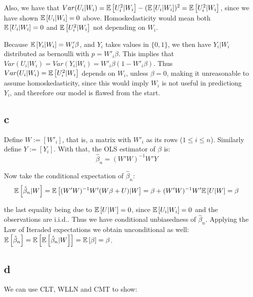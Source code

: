 \documentclass[12pt]{paper}
\begin{document}
Also, we have that $Var(U_i|W_i)=\mathbb{E} \left [ U_i^2|W_i \right ]-(\mathbb{E} \left [ U_i|W_i \right ])^2=\mathbb{E} \left [ U_i^2|W_i \right ]$, since we have shown $\mathbb{E} \left [ U_i|W_i \right ]=0$ above. Homoskedasticity would mean both $\mathbb{E} \left [ U_i|W_i \right ]=0$ and $\mathbb{E} \left [ U_i^2|W_i \right ]$ not depending on $W_i$.

Because $\mathbb{E} \left [ Y_i|W_i \right ]=W'_i\beta$, and $Y_i$ takes values in $\{0,1\}$, we then have $Y_i|W_i$ distributed as bernoulli with $p=W'_i\beta$. This implies that $Var(U_i|W_i)=Var(Y_i|W_i)=W'_i\beta(1-W'_i\beta)$. Thus $Var(U_i|W_i)=\mathbb{E} \left [ U_i^2|W_i \right ]$ depends on $W_i$, unless $\beta=0$, making it unreasonable to assume homoskedasticity, since this would imply $W_i$ is not useful in predictiong $Y_i$, and therefore our model is flawed from the start.

\subsection*{c}

Define $W:=[W'_i]$, that is, a matrix with $W'_i$ as its rows ($1\le i\le n$). Similarly define $Y:=[Y_i]$. With that, the OLS estimator of $\beta$ is:
 \begin{equation}
\hat{\beta}_n=(W'W)^{-1}W'Y
\end{equation}

Now take the conditional expectation of $\hat{\beta}_n$:
\begin{equation}
\mathbb{E} \left [ \hat{\beta}_n|W \right ]=\mathbb{E} \left [ (W'W)^{-1}W'(W\beta+U)|W \right ]=\beta+(W'W)^{-1}W'\mathbb{E} \left [ U|W \right ]=\beta
\end{equation}

\noindent the last equality being due to $\mathbb{E} \left [ U|W \right ]=0$, since $\mathbb{E} \left [ U_i|W_i \right ]=0$ and the observations are i.i.d.. Thus we have conditional unbiasedness of $\hat{\beta}_n$. Applying the Law of Iteraded expectations we obtain unconditional as well: $\mathbb{E} \left [ \hat{\beta}_n \right ]=\mathbb{E} \left [ \mathbb{E} \left [ \hat{\beta}_n|W \right ] \right ]=\mathbb{E} \left [ \beta \right ]=\beta$.

\subsection*{d}

We can use CLT, WLLN and CMT to show:
\end{document}
